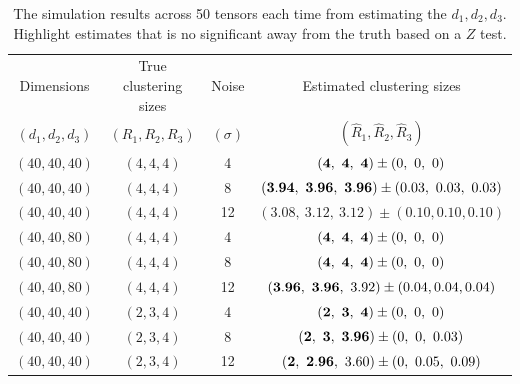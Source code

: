\documentclass{article}
\begin{document}
\begin{appendices}
\begin{table}[http]
	\centering
	\begin{tabular}{c|c|c|c}
		\hline
		Dimensions &True clustering sizes&Noise&Estimated clustering sizes\\ 
$(d_1,d_2,d_3)$&$(R_1,R_2,R_3)$&$(\sigma)$&$(\hat R_1,\hat R_2,\hat R_3)$\\
		\hline
		$(40,40,40)$&$(4,4,4)$&4&$({\bf 4},\ {\bf 4},\ {\bf 4})\pm (0,\ 0,\ 0)$\\
		$(40,40,40)$&$(4,4,4)$&8&$({\bf 3.94},\ {\bf 3.96},\ {\bf 3.96})\pm (0.03,\ 0.03,\ 0.03)$\\
		$(40,40,40)$&$(4,4,4)$&12&$(3.08,\ 3.12,\ 3.12)\pm (0.10,0.10,0.10)$\\
		\hline
		$(40,40,80)$&$(4,4,4)$&4&$({\bf 4},\ {\bf 4},\ {\bf 4})\pm (0,\ 0,\ 0)$\\
		$(40,40,80)$&$(4,4,4)$&8&$({\bf 4},\ {\bf 4},\ {\bf 4})\pm (0,\ 0,\ 0)$\\
		$(40,40,80)$&$(4,4,4)$&12&$({\bf 3.96},\ {\bf 3.96},\ 3.92)\pm (0.04,0.04,0.04)$\\
			\hline
		$(40,40,40)$&$(2,3,4)$&4&$({\bf 2},\ {\bf 3},\ {\bf 4})\pm (0,\ 0,\ 0)$\\
		$(40,40,40)$&$(2,3,4)$&8&$({\bf 2},{\bf \ 3},\ {\bf 3.96})\pm (0,\ 0,\ 0.03)$ \\
		$(40,40,40)$&$(2,3,4)$&12&$({\bf 2},\ {\bf 2.96},\ 3.60)\pm (0,\ 0.05,\ 0.09)$
	\end{tabular}
	\caption{The simulation results across 50 tensors each time from estimating the $d_1,d_2,d_3$. Highlight estimates that is no significant away from the truth based on a $Z$ test.}\label{t2}
\end{table}



\end{appendices}
\end{document}
